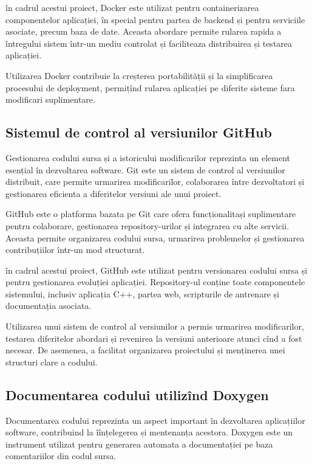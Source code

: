 în cadrul acestui proiect, Docker este utilizat pentru containerizarea componentelor aplicației, în special pentru partea de backend și pentru serviciile asociate, precum baza de date. Aceasta abordare permite rularea rapida a întregului sistem într-un mediu controlat și faciliteaza distribuirea și testarea aplicației.

Utilizarea Docker contribuie la creșterea portabilității și la simplificarea procesului de deployment, permițînd rularea aplicației pe diferite sisteme fara modificari suplimentare.

\subsection*{Sistemul de control al versiunilor GitHub}

Gestionarea codului sursa și a istoricului modificarilor reprezinta un element esențial în dezvoltarea software. Git este un sistem de control al versiunilor distribuit, care permite urmarirea modificarilor, colaborarea între dezvoltatori și gestionarea eficienta a diferitelor versiuni ale unui proiect.

GitHub este o platforma bazata pe Git care ofera funcționalitași suplimentare pentru colaborare, gestionarea repository-urilor și integrarea cu alte servicii. Aceasta permite organizarea codului sursa, urmarirea problemelor și gestionarea contribuțiilor într-un mod structurat.

în cadrul acestui proiect, GitHub este utilizat pentru versionarea codului sursa și pentru gestionarea evoluției aplicației. Repository-ul conține toate componentele sistemului, inclusiv aplicația C++, partea web, scripturile de antrenare și documentația asociata.

Utilizarea unui sistem de control al versiunilor a permis urmarirea modificarilor, testarea diferitelor abordari și revenirea la versiuni anterioare atunci cînd a fost necesar. De asemenea, a facilitat organizarea proiectului și menținerea unei structuri clare a codului.

\subsection*{Documentarea codului utilizînd Doxygen}

Documentarea codului reprezinta un aspect important în dezvoltarea aplicațiilor software, contribuind la îînțelegerea și mentenanța acestora. Doxygen este un instrument utilizat pentru generarea automata a documentației pe baza comentariilor din codul sursa.

